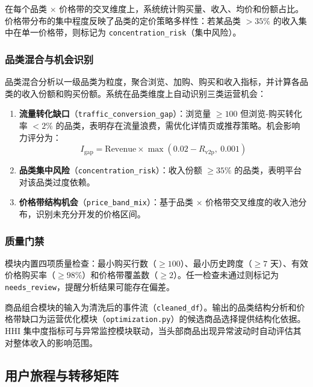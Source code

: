 在每个品类 $\times$ 价格带的交叉维度上，系统统计购买量、收入、均价和份额占比。价格带分布的集中程度反映了品类的定价策略多样性：若某品类 $>35\%$ 的收入集中在单一价格带，则标记为 \texttt{concentration\_risk}（集中风险）。

\subsubsection{品类混合与机会识别}

品类混合分析以一级品类为粒度，聚合浏览、加购、购买和收入指标，并计算各品类的收入份额和购买份额。系统在品类维度上自动识别三类运营机会：

\begin{enumerate}
    \item \textbf{流量转化缺口}（\texttt{traffic\_conversion\_gap}）：浏览量 $\geq 100$ 但浏览-购买转化率 $< 2\%$ 的品类，表明存在流量浪费，需优化详情页或推荐策略。机会影响力评分为：
          \begin{equation}
              I_{\text{gap}} = \text{Revenue} \times \max\left(0.02 - R_{\text{v2p}},\ 0.001\right)
              \label{eq:traffic-gap-score}
          \end{equation}

    \item \textbf{品类集中风险}（\texttt{concentration\_risk}）：收入份额 $\geq 35\%$ 的品类，表明平台对该品类过度依赖。

    \item \textbf{价格带结构机会}（\texttt{price\_band\_mix}）：基于品类 $\times$ 价格带交叉维度的收入池分布，识别未充分开发的价格区间。
\end{enumerate}

\subsubsection{质量门禁}

模块内置四项质量检查：最小购买行数（$\geq 100$）、最小历史跨度（$\geq 7$ 天）、有效价格购买率（$\geq 98\%$）和价格带覆盖数（$\geq 2$）。任一检查未通过则标记为 \texttt{needs\_review}，提醒分析结果可能存在偏差。

商品组合模块的输入为清洗后的事件流（\texttt{cleaned\_df}）。输出的品类结构分析和价格带缺口为运营优化模块（\texttt{optimization.py}）的候选商品选择提供结构化依据。HHI 集中度指标可与异常监控模块联动，当头部商品出现异常波动时自动评估其对整体收入的影响范围。

\subsection{用户旅程与转移矩阵}

